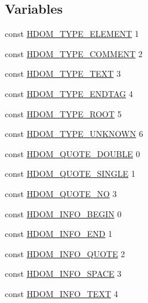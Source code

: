 \subsection*{Variables}
\begin{DoxyCompactItemize}
\item 
const \hyperlink{simple__html__dom_8php_a3436a40c141ec78cc95c71f59f993087}{H\+D\+O\+M\+\_\+\+T\+Y\+P\+E\+\_\+\+E\+L\+E\+M\+E\+NT} 1
\item 
const \hyperlink{simple__html__dom_8php_ae045af0527e4d0ebd351cbd0b0ff8124}{H\+D\+O\+M\+\_\+\+T\+Y\+P\+E\+\_\+\+C\+O\+M\+M\+E\+NT} 2
\item 
const \hyperlink{simple__html__dom_8php_a453ed0a38bfe7684e94b0a2462317581}{H\+D\+O\+M\+\_\+\+T\+Y\+P\+E\+\_\+\+T\+E\+XT} 3
\item 
const \hyperlink{simple__html__dom_8php_a9ede8929bc6af082032dc7fc3becc2f5}{H\+D\+O\+M\+\_\+\+T\+Y\+P\+E\+\_\+\+E\+N\+D\+T\+AG} 4
\item 
const \hyperlink{simple__html__dom_8php_a5ac9d18762d1096b83d441660091b94b}{H\+D\+O\+M\+\_\+\+T\+Y\+P\+E\+\_\+\+R\+O\+OT} 5
\item 
const \hyperlink{simple__html__dom_8php_a1dc6000425365b26eb74247a720d3c33}{H\+D\+O\+M\+\_\+\+T\+Y\+P\+E\+\_\+\+U\+N\+K\+N\+O\+WN} 6
\item 
const \hyperlink{simple__html__dom_8php_a827ba5d43b28b0019b25bfdc4c7e2715}{H\+D\+O\+M\+\_\+\+Q\+U\+O\+T\+E\+\_\+\+D\+O\+U\+B\+LE} 0
\item 
const \hyperlink{simple__html__dom_8php_ac662929a9b7fc153be9f5e6b7030f848}{H\+D\+O\+M\+\_\+\+Q\+U\+O\+T\+E\+\_\+\+S\+I\+N\+G\+LE} 1
\item 
const \hyperlink{simple__html__dom_8php_a80e228a23e5559489d524efbeaf418ea}{H\+D\+O\+M\+\_\+\+Q\+U\+O\+T\+E\+\_\+\+NO} 3
\item 
const \hyperlink{simple__html__dom_8php_a05decffbdf780e841c1198d24aa889a1}{H\+D\+O\+M\+\_\+\+I\+N\+F\+O\+\_\+\+B\+E\+G\+IN} 0
\item 
const \hyperlink{simple__html__dom_8php_adeab85900893208119e3d1f2b3e2fca1}{H\+D\+O\+M\+\_\+\+I\+N\+F\+O\+\_\+\+E\+ND} 1
\item 
const \hyperlink{simple__html__dom_8php_a5279528b3cf095b0488b0b005607f909}{H\+D\+O\+M\+\_\+\+I\+N\+F\+O\+\_\+\+Q\+U\+O\+TE} 2
\item 
const \hyperlink{simple__html__dom_8php_a6ad37ea016cdee2f705b1e475ed7a285}{H\+D\+O\+M\+\_\+\+I\+N\+F\+O\+\_\+\+S\+P\+A\+CE} 3
\item 
const \hyperlink{simple__html__dom_8php_a12f107a4dccc35d4321ff20028fbd476}{H\+D\+O\+M\+\_\+\+I\+N\+F\+O\+\_\+\+T\+E\+XT} 4

\end{DoxyCompactItemize}

